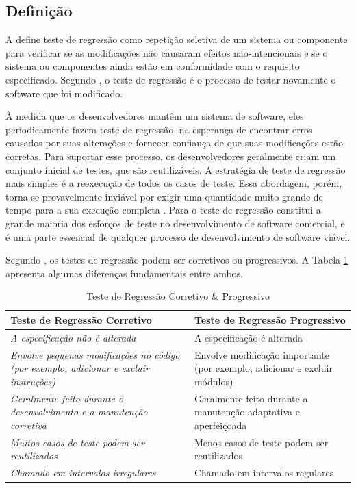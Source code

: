 \subsection{Definição}

 A  define teste de regressão como repetição seletiva de um sistema ou componente para verificar se as modificações não causaram efeitos não-intencionais e se o sistema ou componentes ainda estão em conformidade com o requisito especificado. Segundo , o teste de regressão é o processo de testar novamente o software que foi modificado. 
 
 À medida que os desenvolvedores mantêm um sistema de software, eles periodicamente fazem teste de regressão, na esperança de encontrar erros causados por suas alterações e fornecer confiança de que suas modificações estão corretas. Para suportar esse processo, os desenvolvedores geralmente criam um conjunto inicial de testes, que são reutilizáveis. A estratégia de teste de regressão mais simples é a reexecução de todos os casos de teste. Essa abordagem, porém, torna-se provavelmente inviável por exigir uma quantidade muito grande de tempo para a sua execução completa \cite{Graves:2001:ESR:367008.367020}. Para  o teste de regressão constitui a grande maioria dos esforços de teste no desenvolvimento de software comercial, e é uma parte essencial de qualquer processo de desenvolvimento de software viável.
 
 Segundo , os testes de regressão podem ser corretivos ou progressivos. A Tabela \ref{table:TRCP} apresenta algumas diferenças fundamentais entre ambos.

 
\begin{table}[th]
    \footnotesize
    \centering
    \caption{Teste de Regressão Corretivo \& Progressivo \cite{65194}}
    \label{table:TRCP}
    \def \arraystretch{1.3}
    \begin{tabular}{m{6.5cm}m{6.5cm}}
        \toprule
        \textbf{Teste de Regressão Corretivo} & \textbf{Teste de Regressão Progressivo} \\
        \midrule
        \textit{A especificação não é alterada} & A especificação é alterada\\
        \textit{Envolve pequenas modificações no código (por exemplo, adicionar e excluir instruções)} & Envolve modificação importante (por exemplo, adicionar e excluir módulos)\\ 
        \textit{Geralmente feito durante o desenvolvimento e a manutenção corretiva} & Geralmente feito durante a manutenção adaptativa e aperfeiçoada\\
        \textit{Muitos casos de teste podem ser reutilizados} & Menos casos de teste podem ser reutilizados\\
        \textit{Chamado em intervalos irregulares} & Chamado em intervalos regulares\\
        \bottomrule
    \end{tabular}
\end{table}

